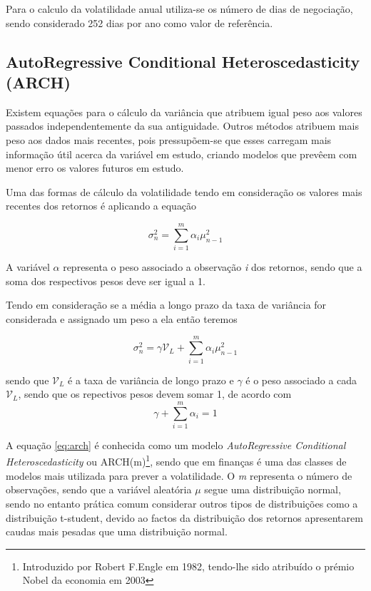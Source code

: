 \documentclass[
  12pt,
  a4paper,
  openany]{book}
\begin{document}
Para o calculo da volatilidade anual utiliza-se os número de dias de negociação, sendo considerado 252 dias por ano como valor de referência.

\hypertarget{autoregressive-conditional-heteroscedasticity-arch}{%
\subsection{AutoRegressive Conditional Heteroscedasticity (ARCH)}\label{autoregressive-conditional-heteroscedasticity-arch}}

Existem equações para o cálculo da variância que atribuem igual peso aos valores passados independentemente da sua antiguidade. Outros métodos atribuem mais peso aos dados mais recentes, pois pressupõem-se que esses carregam mais informação útil acerca da variável em estudo, criando modelos que prevêem com menor erro os valores futuros em estudo.

Uma das formas de cálculo da volatilidade tendo em consideração os valores mais recentes dos retornos é aplicando a equação

\begin{equation} 
  \sigma_{n}^{2} =\sum_{i=1}^{m}\alpha_i\mu_{n-1}^{2}
  \label{eq:weight}
\end{equation}

A variável \(\alpha\) representa o peso associado a observação \emph{i} dos retornos, sendo que a soma dos respectivos pesos deve ser igual a 1.

Tendo em consideração \citet{Hull2018} se a média a longo prazo da taxa de variância for considerada e assignado um peso a ela então teremos

\begin{equation} 
  \sigma_{n}^{2} =\gamma\mathcal{V}_{L}+\sum_{i=1}^{m}\alpha_i\mu_{n-1}^{2}
  \label{eq:arch}
\end{equation}

sendo que \(\mathcal{V}_{L}\) é a taxa de variância de longo prazo e \(\gamma\) é o peso associado a cada \(\mathcal{V}_{L}\), sendo que os repectivos pesos devem somar 1, de acordo com \[\gamma + \sum_{i=1}^{m}\alpha_i = 1\]

A equação \eqref{eq:arch} é conhecida como um modelo \emph{AutoRegressive Conditional Heteroscedasticity} ou ARCH(m)\footnote{Introduzido por Robert F.Engle em 1982, tendo-lhe sido atribuído o prémio Nobel da economia em 2003}, sendo que em finanças é uma das classes de modelos mais utilizada para prever a volatilidade. O \emph{m} representa o número de observações, sendo que a variável aleatória \(\mu\) segue uma distribuição normal, sendo no entanto prática comum considerar outros tipos de distribuições como a distribuição t-student, devido ao factos da distribuição dos retornos apresentarem caudas mais pesadas que uma distribuição normal.
\end{document}
